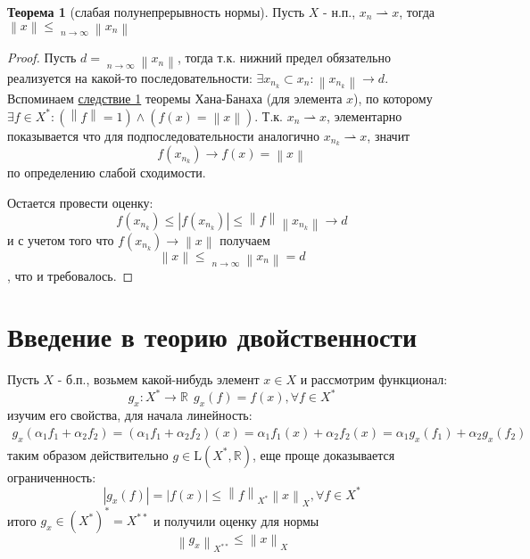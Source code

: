 \documentclass[12pt,a4paper]{article}
\theoremstyle{definition}
\newtheorem{theorem}{Теорема}
\newcommand{\Real}{\mathbb{R}}
\newcommand{\norm}[1]{\left\lVert#1\right\rVert}
\DeclareMathOperator*\lowlim{\underline{lim}}
\newcommand{\linear}[2]{\textrm{L}(#1, #2)}
\newcommand{\conj}[1]{\left(#1\right)^*}
\newcommand{\weakto}{\rightharpoonup}
\begin{document}
\begin{theorem}[слабая полунепрерывность нормы]
	Пусть $X$ - н.п., $x_n \weakto x$, тогда $\norm{x} \leq \lowlim\limits_{n \to \infty}{\norm{x_n}}$
\end{theorem}
\begin{proof}
	Пусть $d = \lowlim\limits_{n \to \infty}{\norm{x_n}}$, тогда т.к. нижний предел обязательно реализуется на какой-то последовательности: $\exists{x_{n_k}} \subset{x_n}: \norm{x_{n_k}} \to d$. Вспоминаем \hyperref[corll:1]{следствие 1} теоремы Хана-Банаха (для элемента $x$), по которому \\ $\exists f \in X^*: (\norm{f} = 1) \wedge (f(x) = \norm{x})$. Т.к. $x_n \weakto x$, элементарно показывается что для подпоследовательности аналогично $x_{n_k} \weakto x$, значит 
	$$f(x_{n_k}) \to f(x) = \norm{x}$$
	по определению слабой сходимости.
	
	Остается провести оценку:
	$$f(x_{n_k}) \leq |f(x_{n_k})| \leq \norm{f} \norm{x_{n_k}} \to d$$
	и с учетом того что $f(x_{n_k}) \to \norm{x}$ получаем
	$$\norm{x} \leq \lowlim\limits_{n \to \infty}{\norm{x_n}} = d$$
	, что и требовалось.
\end{proof}

\section{Введение в теорию двойственности}
Пусть $X$ - б.п., возьмем какой-нибудь элемент $x \in X$ и рассмотрим функционал:
\begin{equation}\label{eq:5}
	g_{x}: X^* \to \Real \ \ g_{x}(f) = f(x), \forall f \in X^*
\end{equation}
изучим его свойства, для начала линейность:
\begin{multline*}
		g_{x}(\alpha_1 f_1 + \alpha_2 f_2) = (\alpha_1 f_1 + \alpha_2 f_2)(x) = \alpha_1 f_1 (x) + \alpha_2 f_2 (x) = \alpha_1 g_{x}(f_1) + \alpha_2 g_{x}(f_2)
\end{multline*}
таким образом действительно $g \in \linear{X^*}{\Real}$, еще проще доказывается ограниченность:
\begin{equation*}
	|g_{x}(f)| = |f(x)| \leq \norm{f}_{X^*} \norm{x}_{X}, \forall f \in X^*
\end{equation*}
итого $g_{x} \in \conj{X^*} = X^{**}$ и получили оценку для нормы 
\begin{equation}\label{eq:4}
	\norm{g_{x}}_{X^{**}} \leq \norm{x}_X
\end{equation}
\end{document}
